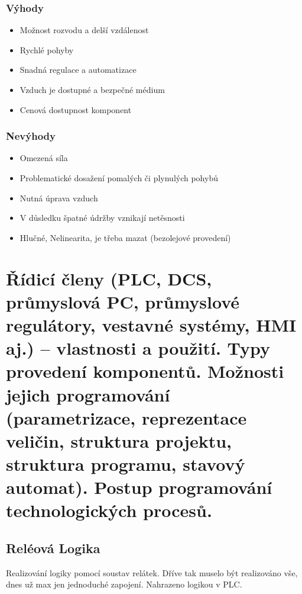 \subsubsection*{Výhody}
\begin{itemize}
  \item Možnost rozvodu a delší vzdálenost
  \item Rychlé pohyby
  \item Snadná regulace a automatizace
  \item Vzduch je dostupné a bezpečné médium
  \item Cenová dostupnost komponent
\end{itemize}

\subsubsection*{Nevýhody}
\begin{itemize}
  \item Omezená síla
  \item Problematické dosažení pomalých či plynulých pohybů
  \item Nutná úprava vzduch
  \item V důsledku špatné údržby vznikají netěsnosti
  \item Hlučné, Nelinearita, je třeba mazat (bezolejové provedení)
\end{itemize}

\section{Řídicí členy (PLC, DCS, průmyslová PC, průmyslové regulátory, vestavné systémy, HMI aj.) – vlastnosti a použití. Typy provedení komponentů. Možnosti jejich programování (parametrizace, reprezentace veličin, struktura projektu, struktura programu, stavový automat). Postup programování technologických procesů.}

\subsection{Reléová Logika}
Realizování logiky pomocí soustav relátek. Dříve tak muselo být realizováno vše, dnes už max jen jednoduché zapojení. Nahrazeno logikou v PLC.

